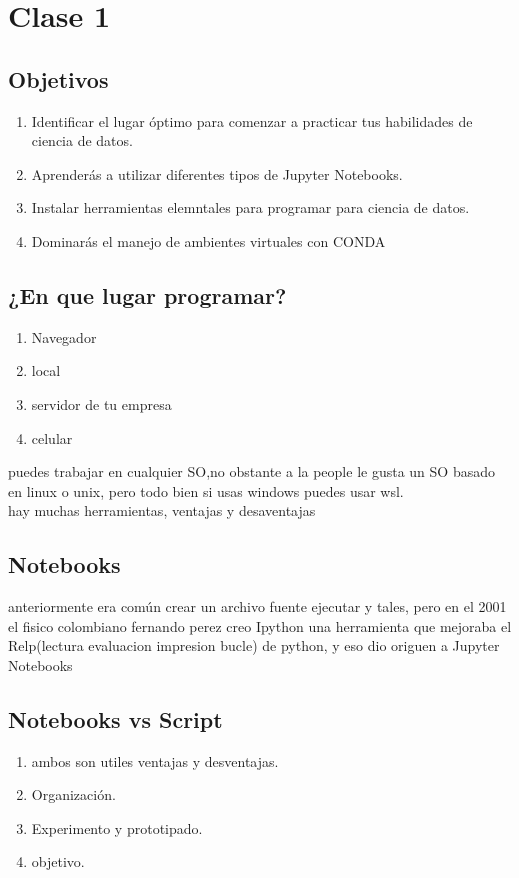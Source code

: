 \documentclass{article}
\begin{document}
    \section{Clase 1}
    \subsection{Objetivos}
    \begin{enumerate}
        \item Identificar el lugar óptimo para comenzar a practicar tus habilidades de ciencia de 
        datos. 
        \item Aprenderás a utilizar diferentes tipos de Jupyter Notebooks. 
        \item Instalar herramientas elemntales para programar para ciencia de datos. 
        \item Dominarás el manejo de ambientes virtuales con CONDA
    \end{enumerate}
    \subsection{¿En que lugar programar?}
    \begin{enumerate}
        \item Navegador
        \item local 
        \item servidor de tu empresa
        \item celular
    \end{enumerate}
    puedes trabajar en cualquier SO,no obstante a la people le gusta un SO basado en linux o unix, pero todo bien 
    si usas windows puedes usar wsl. \\
    hay muchas herramientas, ventajas y desaventajas
    \subsection{Notebooks}
    anteriormente era común crear un archivo fuente ejecutar y tales, pero en el 2001 el fisico colombiano fernando perez 
    creo Ipython una herramienta que mejoraba el Relp(lectura evaluacion impresion bucle) de python, y eso dio origuen a Jupyter Notebooks
    \subsection{Notebooks vs Script}
    \begin{enumerate}
        \item ambos son utiles ventajas y desventajas. 
        \item Organización. 
        \item Experimento y prototipado. 
        \item objetivo. 
    \end{enumerate}
\end{document}
